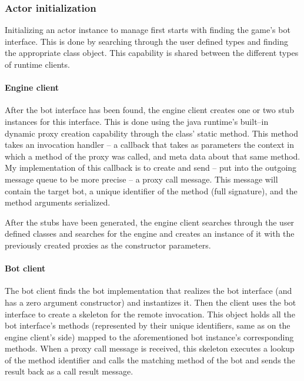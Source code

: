 		\subsubsection*{Actor initialization}
		
		Initializing an actor instance to manage first starts with finding the game's bot interface. This is done by searching through the user defined types and finding the appropriate class object. This capability is shared between the different types of runtime clients.
		
			\paragraph{Engine client}
		
			After the bot interface has been found, the engine client creates one or two stub instances for this interface. This is done using the java runtime's built--in dynamic proxy creation capability through the  class' static  method. This method takes an invocation handler -- a callback that takes as parameters the context in which a method of the proxy was called, and meta data about that same method. My implementation of this callback is to create and send -- put into the outgoing message queue to be more precise -- a proxy call message. This message will contain the target bot, a unique identifier of the method (full signature), and the method arguments serialized.
			
			After the stubs have been generated, the engine client searches through the user defined classes and searches for the engine and creates an instance of it with the previously created proxies as the constructor parameters.
			
			\paragraph{Bot client}
			
			The bot client finds the bot implementation that realizes the bot interface (and has a zero argument constructor) and instantizes it. Then the client uses the bot interface to create a skeleton for the remote invocation. This object holds all the bot interface's methods (represented by their unique identifiers, same as on the engine client's side) mapped to the aforementioned bot instance's corresponding methods. When a proxy call message is received, this skeleton executes a lookup of the method identifier and calls the matching method of the bot and sends the result back as a call result message. 
			
%






